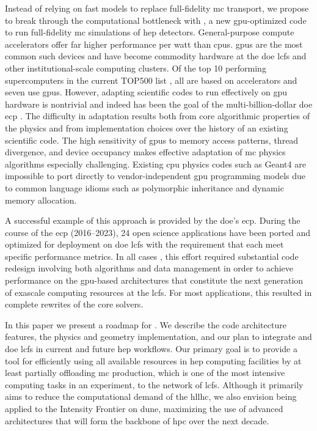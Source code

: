 Instead of relying on fast models to replace full-fidelity \ac{mc} transport, we
propose to break through the computational bottleneck with \celeritas
\cite{johnson_2021}, a new \ac{gpu}-optimized code to run full-fidelity \ac{mc}
simulations of \acs{hep} detectors. General-purpose compute accelerators offer
far higher performance per watt than \acp{cpu}.  \acp{gpu} are the most common
such devices and have become commodity hardware at the \ac{doe} \acp{lcf} and
other institutional-scale computing clusters. Of the top 10 performing
supercomputers in the current TOP500 list \cite{top500}, all are based on
accelerators and seven use \nvidia \acp{gpu}. However, adapting scientific codes
to run effectively on \ac{gpu} hardware is nontrivial and indeed has been the
goal of the multi-billion-dollar \ac{doe} \ac{ecp} \cite{ecp2019}. The
difficulty in adaptation results both from core algorithmic properties of the
physics and from implementation choices over the history of an existing
scientific code. The high sensitivity of \acp{gpu} to memory access patterns,
thread divergence, and device occupancy makes effective adaptation of \ac{mc}
physics algorithms especially challenging. Existing \ac{cpu} physics codes such
as Geant4 are impossible to port directly to vendor-independent \ac{gpu}
programming models due to common \Cpp language idioms such as polymorphic
inheritance and dynamic memory allocation.

A successful example of this approach is provided by the
\ac{doe}'s \ac{ecp}. During the course of the \ac{ecp} (2016--2023), 24 open
science applications have been ported and optimized for deployment on \ac{doe}
\acp{lcf} with the requirement that each meet specific performance metrics.  In
all cases \cite{evans_survey_2021}, this effort required substantial code
redesign involving both algorithms and data management in order to achieve
performance on the \ac{gpu}-based architectures that constitute the next
generation of exascale computing resources at the \acp{lcf}. For most
applications, this resulted in complete rewrites of the core solvers.

In this paper we present a roadmap for \celeritas. We describe the code
architecture features, the physics and geometry implementation, and our plan to
integrate \celeritas and \ac{doe} \acp{lcf} in current and future \ac{hep}
workflows. Our primary goal is to provide a tool for efficiently using all
available resources in \ac{hep} computing facilities by at least partially
offloading \ac{mc} production, which is one of the most intensive computing
tasks in an experiment, to the network of \acp{lcf}. Although it primarily aims
to reduce the computational demand of the \acs{hllhc}, we also envision
\celeritas being applied to the Intensity Frontier on \ac{dune}, maximizing the
use of advanced architectures that will form the backbone of \ac{hpc} over the
next decade.

